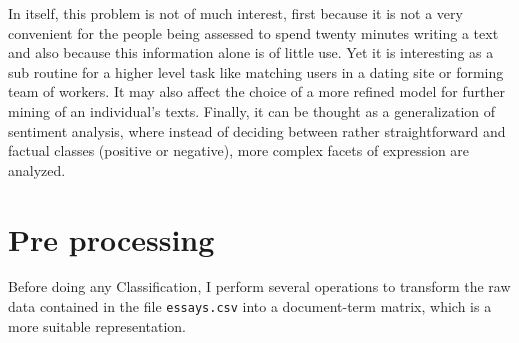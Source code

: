 In itself, this problem is not of much interest, first because it is not a very convenient for the people being assessed to spend twenty minutes writing a text and also because this information alone is of little use. Yet it is interesting as a sub routine for a higher level task like matching users in a dating site or forming team of workers. It may also affect the choice of a more refined model for further mining of an individual's texts. Finally, it can be thought as a generalization of sentiment analysis, where instead of deciding between rather straightforward and factual classes (positive or negative), more complex facets of expression are analyzed.

\section{Pre processing}
\label{sec:preprop}
Before doing any Classification, I perform several operations to transform the raw data contained in the file \texttt{essays.csv} into a document-term matrix, which is a more suitable representation.
